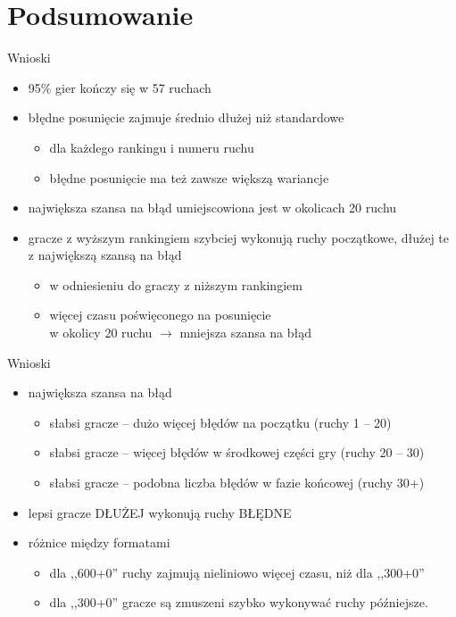 \documentclass{beamer}
\begin{document}
\section{Podsumowanie}

\begin{frame}{Wnioski}
	\begin{itemize}
		\item 95\% gier kończy się w 57 ruchach
		\item błędne posunięcie zajmuje średnio dłużej niż standardowe 
		\begin{itemize}
			\item dla każdego rankingu i numeru ruchu
			\item błędne posunięcie ma też zawsze większą wariancje
		\end{itemize}
		\item największa szansa na błąd umiejscowiona jest w okolicach 20 ruchu
		\item gracze z wyższym rankingiem szybciej wykonują ruchy początkowe, dłużej te z największą szansą na błąd
		\begin{itemize}
			\item w odniesieniu do graczy z niższym rankingiem
			\item więcej czasu poświęconego na posunięcie\\ w okolicy 20 ruchu $\rightarrow$ mniejsza szansa na błąd
		\end{itemize}
		
		
	\end{itemize}
\end{frame}

\begin{frame}{Wnioski}
	\begin{itemize}
		\item największa szansa na błąd
		\begin{itemize}
			\item słabsi gracze -- dużo więcej błędów na początku (ruchy 1 -- 20)
			\item słabsi gracze -- więcej błędów w środkowej części gry (ruchy 20 -- 30)
			\item słabsi gracze -- podobna liczba błędów w fazie końcowej (ruchy 30+)
		\end{itemize} 
		\item lepsi gracze DŁUŻEJ wykonują ruchy BŁĘDNE
		\item różnice między formatami
		\begin{itemize}
			\item dla ,,600+0'' ruchy zajmują nieliniowo więcej czasu, niż dla ,,300+0'' 
			\item dla ,,300+0'' gracze są zmuszeni szybko wykonywać ruchy późniejsze.
		\end{itemize} 
\end{itemize}
\end{frame}
\end{document}
